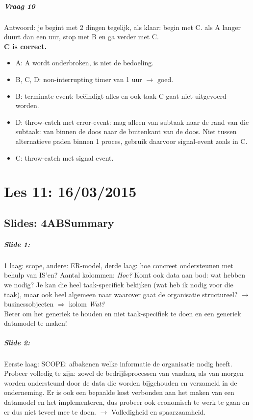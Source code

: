 \documentclass[10pt,a4paper]{report}
\begin{document}
\paragraph{Vraag 10}Antwoord: je begint met 2 dingen tegelijk, als klaar: begin met C. als A langer duurt dan een uur, stop met B en ga verder met C.\\
\textbf{C is correct.}
\begin{itemize}
\item A: A wordt onderbroken, is niet de bedoeling.
\item B, C, D: non-interrupting timer van 1 uur $\rightarrow$ goed.
\item B: terminate-event: beëindigt alles en ook taak C gaat niet uitgevoerd worden.
\item D: throw-catch met error-event: mag alleen van subtaak naar de rand van die subtaak: van binnen de doos naar de buitenkant van de doos. Niet tussen alternatieve paden binnen 1 proces, gebruik daarvoor signal-event zoals in C.
\item C: throw-catch met signal event.
\end{itemize}

\chapter{Les 11: 16/03/2015}
\section{Slides: 4ABSummary}

\paragraph{Slide 1:}1 laag: scope, andere: ER-model, derde laag: hoe concreet ondersteunen met behulp van IS'en? Aantal kolommen: \emph{Hoe?} Komt ook data aan bod: wat hebben we nodig? Je kan die heel taak-specifiek bekijken (wat heb ik nodig voor die taak), maar ook heel algemeen naar waarover gaat de organisatie structureel? $\rightarrow$ businessobjecten $\Rightarrow$ kolom \emph{Wat?}\\
Beter om het generiek te houden en niet taak-specifiek te doen en een generiek datamodel te maken!

\paragraph{Slide 2:}Eerste laag: SCOPE: afbakenen welke informatie de organisatie nodig heeft. Probeer volledig te zijn: zowel de bedrijfsprocessen van vandaag als van morgen worden ondersteund door de data die worden bijgehouden en verzameld in de onderneming. Er is ook een bepaalde kost verbonden aan het maken van een datamodel en het implementeren, dus probeer ook economisch te werk te gaan en er dus niet teveel mee te doen. $\rightarrow$ Volledigheid en spaarzaamheid.
\end{document}
